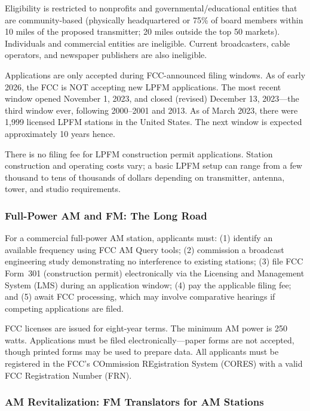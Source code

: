 \documentclass[11pt,letterpaper]{article}
\begin{document}
\begin{asciibox}
Eligibility is restricted to nonprofits and governmental/educational entities that are
community-based (physically headquartered or 75\% of board members within 10 miles of the
proposed transmitter; 20 miles outside the top 50 markets). Individuals and commercial entities
are ineligible. Current broadcasters, cable operators, and newspaper publishers are also ineligible.

Applications are only accepted during FCC-announced filing windows. As of early 2026, the FCC
is NOT accepting new LPFM applications. The most recent window opened November 1, 2023, and
closed (revised) December 13, 2023---the third window ever, following 2000--2001 and 2013.
As of March 2023, there were 1,999 licensed LPFM stations in the United States. The next
window is expected approximately 10 years hence.

There is no filing fee for LPFM construction permit applications. Station construction and
operating costs vary; a basic LPFM setup can range from a few thousand to tens of thousands
of dollars depending on transmitter, antenna, tower, and studio requirements.

\subsubsection{Full-Power AM and FM: The Long Road}

For a commercial full-power AM station, applicants must: (1) identify an available frequency
using FCC AM Query tools; (2) commission a broadcast engineering study demonstrating no
interference to existing stations; (3) file FCC Form~301 (construction permit) electronically
via the Licensing and Management System (LMS) during an application window; (4) pay the
applicable filing fee; and (5) await FCC processing, which may involve comparative hearings
if competing applications are filed.

FCC licenses are issued for eight-year terms. The minimum AM power is 250 watts. Applications
must be filed electronically---paper forms are not accepted, though printed forms may be used
to prepare data. All applicants must be registered in the FCC's COmmission REgistration System
(CORES) with a valid FCC Registration Number (FRN).

\subsubsection{AM Revitalization: FM Translators for AM Stations}


\end{asciibox}
\end{document}
